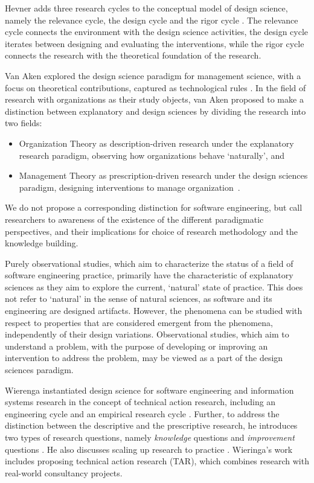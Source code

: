 \documentclass[graybox]{svmult}
\begin{document}
Hevner adds three research cycles to the conceptual model of design science, namely the relevance cycle, the design cycle and the rigor cycle \cite{Hevner2007}. The relevance cycle connects the environment with the design science activities, the design  cycle iterates between designing and evaluating the interventions, while the rigor cycle connects the research with the theoretical foundation of the research.



Van Aken explored the design science paradigm for management science, with a focus on theoretical contributions, captured as technological rules \cite{van_aken_management_2004,van_aken_management_2005}. 
In the field of research with organizations as their study objects, van Aken proposed to make a distinction between explanatory and design sciences by dividing the research into two fields: 
\begin{itemize}
\item Organization Theory as description-driven research under the explanatory research paradigm, observing how organizations behave `naturally', and 
\item Management Theory as prescription-driven research under the design sciences paradigm, designing interventions to manage organization~\cite{van_aken_management_2004}.  
\end{itemize}

We do not propose a corresponding distinction for software engineering, but call researchers to awareness of the existence of the different paradigmatic perspectives, and their implications for choice of research methodology and the knowledge building.

Purely observational studies, which aim to characterize the status of a field of software engineering practice, primarily have the characteristic of explanatory sciences as they aim to explore the current, `natural'  state of practice. This does not refer to `natural' in the sense of natural sciences, as software and its engineering are designed artifacts. However, the phenomena can be studied with respect to properties that are considered emergent from the phenomena, independently of their design variations. Observational studies, which aim to understand a problem, with the purpose of developing or improving an intervention to address the problem, may be viewed as a part of the design sciences paradigm. 


Wierenga instantiated design science for software engineering and information systems research in the concept of technical action research, including an engineering cycle and an empirical research cycle \cite{wieringa_design_2009,wieringa_six_2015,wieringa_technical_2012,wieringa_what_2014}. Further, to address the distinction between the descriptive and the prescriptive research, he introduces two types of research questions, namely \emph{knowledge} questions and \emph{improvement} questions \cite{}. He also discusses scaling up research to practice \cite{Wieringa2014}. Wieringa's work includes proposing technical action research (TAR), which combines research with real-world consultancy projects.
\end{document}
